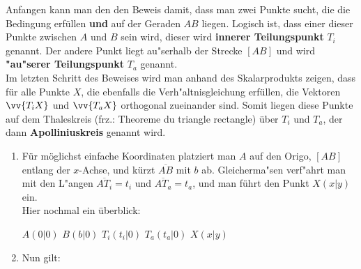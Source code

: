 \begin{\small}
\begin{Beweis}
\begin{small}
  Anfangen kann man den den Beweis damit, dass man zwei Punkte sucht, die die Bedingung erfüllen \textbf{und} auf der Geraden $AB$ liegen. Logisch ist, dass einer dieser Punkte zwischen $A$ und $B$ sein wird, dieser wird \textbf{innerer Teilungspunkt} $T_{i}$ genannt. Der andere Punkt liegt au"serhalb der Strecke $[AB]$ und wird \textbf{"au"serer Teilungspunkt} $T_{a}$ genannt. \\
  Im letzten Schritt des Beweises wird man anhand des Skalarprodukts zeigen, dass für alle Punkte $X$, die ebenfalls die Verh"altnisgleichung erfüllen, die Vektoren $\vv{T_{i}X}$ und $\vv{T_{a}X}$ orthogonal zueinander sind. Somit liegen diese Punkte auf dem Thaleskreis (frz.: Theoreme du triangle rectangle) über $T_{i}$ und $T_{a}$, der dann \textbf{Apolliniuskreis} genannt wird.\\
\end{small}
\begin{enumerate}
  \item
  Für möglichst einfache Koordinaten platziert man $A$ auf den Origo, $[AB]$ entlang der $x$-Achse, und kürzt $\overline{AB}$ mit $b$ ab. Gleicherma"sen verf"ahrt man mit den L"angen $\overline{AT_{i}}=t_{i}$ und $\overline{AT_{a}}= t_{a}$, und man führt den Punkt $X(x|y)$ ein.\\
  Hier nochmal ein überblick:
  \begin{center}
    \vartriangleright $A(0|0)$ \qquad \vartriangleright $B(b|0)$ \qquad \vartriangleright $T_{i}(t_{i}|0)$ \qquad \vartriangleright $T_{a}(t_{a}|0)$ \qquad \vartriangleright $X(x|y)$
  \end{center}

  \item
    Nun gilt:
    

\end{enumerate}
\end{Beweis}
\end{\small}
